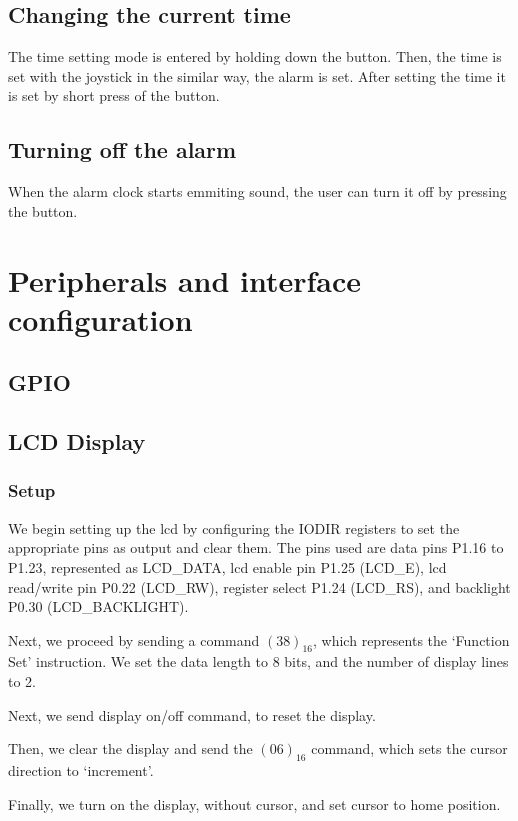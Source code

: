\documentclass[10pt]{article}
\begin{document}
    \subsection{Changing the current time}
    The time setting mode is entered by holding down the button.
    Then, the time is set with the joystick in the similar way, the alarm is set.
    After setting the time it is set by short press of the button.

    \subsection{Turning off the alarm}
    When the alarm clock starts emmiting sound, the user can turn it off by pressing the button.

    \section{Peripherals and interface configuration}
    
    \subsection{GPIO}
    
    \subsection{LCD Display}
    \subsubsection{Setup}
    We begin setting up the lcd by configuring the IODIR registers to set the appropriate pins as output and clear them.
    The pins used are data pins P1.16 to P1.23, represented as {LCD\_DATA}, lcd enable pin P1.25 (LCD\_E), lcd \mbox{read/write} pin P0.22 (LCD\_RW), register select P1.24 (LCD\_RS), and backlight P0.30 (LCD\_BACKLIGHT).

    Next, we proceed by sending a command $(38)_{16}$, which represents the `Function Set' instruction.
    We set the data length to 8 bits, and the number of display lines to 2.

    Next, we send display on/off command, to reset the display.

    Then, we clear the display and send the $(06)_{16}$ command, which sets the cursor direction to `increment'.

    Finally, we turn on the display, without cursor, and set cursor to home position.
\end{document}
